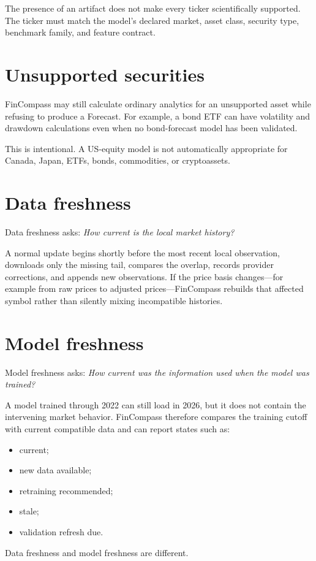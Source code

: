 \documentclass[11pt]{article}
\begin{document}
The presence of an artifact does not make every ticker scientifically supported. The ticker must match the model's declared market, asset class, security type, benchmark family, and feature contract.

\section{Unsupported securities}
FinCompass may still calculate ordinary analytics for an unsupported asset while refusing to produce a Forecast. For example, a bond ETF can have volatility and drawdown calculations even when no bond-forecast model has been validated.

This is intentional. A US-equity model is not automatically appropriate for Canada, Japan, ETFs, bonds, commodities, or cryptoassets.

\section{Data freshness}
Data freshness asks: \emph{How current is the local market history?}

A normal update begins shortly before the most recent local observation, downloads only the missing tail, compares the overlap, records provider corrections, and appends new observations. If the price basis changes---for example from raw prices to adjusted prices---FinCompass rebuilds that affected symbol rather than silently mixing incompatible histories.

\section{Model freshness}
Model freshness asks: \emph{How current was the information used when the model was trained?}

A model trained through 2022 can still load in 2026, but it does not contain the intervening market behavior. FinCompass therefore compares the training cutoff with current compatible data and can report states such as:
\begin{itemize}
\item current;
\item new data available;
\item retraining recommended;
\item stale;
\item validation refresh due.
\end{itemize}

Data freshness and model freshness are different.
\end{document}
